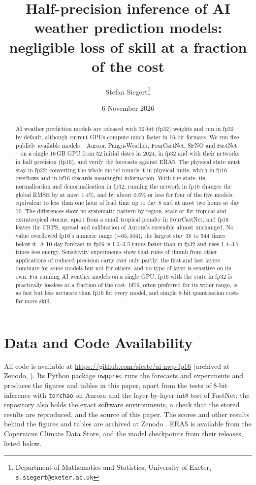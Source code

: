 \documentclass[11pt]{article}
\title{Half-precision inference of AI weather prediction models: negligible loss of skill at a fraction of the cost}
\author{Stefan Siegert\footnote{Department of Mathematics and Statistics, University of Exeter, \texttt{s.siegert@exeter.ac.uk}}}
\date{6 November 2026}
\newif\ifskim \skimfalse
\newcommand{\skim}[1]{\ifskim\textbf{#1}\ \fi}
\begin{document}
\maketitle


\begin{abstract}
AI weather prediction models are released with 32-bit (fp32)
weights and run in fp32 by default, although current GPUs compute much
faster in 16-bit formats. We run five publicly available models --
Aurora, Pangu-Weather, FourCastNet, SFNO and FastNet -- on a single
16\,GB GPU from 52 initial dates in 2024, in fp32 and with their networks
in half precision (fp16), and verify the forecasts against ERA5. The
physical state must stay in fp32: converting the whole model rounds it
in physical units, which in fp16 overflows and in bf16 discards
meaningful information. With the state, its normalisation and
denormalisation in fp32, running the network in fp16 changes the global
RMSE by at most 1.4\%, and by about 0.5\% or less for four of the five
models, equivalent to less than one hour of lead time up to day 8 and at
most two hours at day 10. The differences show no systematic pattern by
region, scale or for tropical and extratropical storms, apart from a
small tropical penalty in FourCastNet, and fp16 leaves the CRPS, spread
and calibration of Aurora's ensemble almost unchanged. No value
overflowed fp16's numeric range ($\pm65{,}504$); the largest stay 38 to 544 times below it. A
10-day forecast in fp16 is 1.3--3.5 times faster than in fp32 and uses
1.4--3.7 times less energy. Sensitivity experiments show that rules of
thumb from other applications of reduced precision carry over only
partly: the first and last layers dominate for some models but not for
others, and no type of layer is sensitive on its own. For running AI
weather models on a single GPU, fp16 with the state in fp32 is
practically lossless at a fraction of the cost. bf16, often preferred for
its wider range, is as fast but less accurate than fp16 for every model,
and simple 8-bit quantisation costs far more skill.
\end{abstract}








\section*{Data and Code Availability}
\skim{Code and data availability.}
All code is available at \url{https://github.com/sieste/ai-nwp-fp16}
(archived at Zenodo, \citealp{siegert2026code}). Its Python package \texttt{nwpprec} runs
the forecasts and experiments and produces the figures and tables in this
paper, apart from the tests of 8-bit inference with \texttt{torchao} on Aurora
and the layer-by-layer int8 test of FastNet; the
repository also holds the exact software environments, a check that the
stored results are reproduced, and the source of this paper. The scores
and other results behind the figures and tables are archived at Zenodo
\citep{siegert2026data}. ERA5 is available from the Copernicus Climate Data
Store, and the model checkpoints from their releases, listed below.
\end{document}
